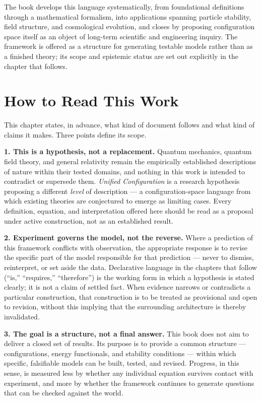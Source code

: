 \documentclass[11pt,oneside]{book}
\begin{document}
The book develops this language systematically, from foundational
definitions through a mathematical formalism, into applications spanning
particle stability, field structure, and cosmological evolution, and closes
by proposing configuration space itself as an object of long-term
scientific and engineering inquiry. The framework is offered as a
structure for generating testable models rather than as a finished theory;
its scope and epistemic status are set out explicitly in the chapter that
follows.

\chapter*{How to Read This Work}

This chapter states, in advance, what kind of document follows and what
kind of claims it makes. Three points define its scope.

\bigskip
\noindent\textbf{1. This is a hypothesis, not a replacement.}
Quantum mechanics, quantum field theory, and general relativity remain the
empirically established descriptions of nature within their tested domains,
and nothing in this work is intended to contradict or supersede them.
\emph{Unified Configuration} is a research hypothesis proposing a different
\emph{level} of description --- a configuration-space language from which
existing theories are conjectured to emerge as limiting cases. Every
definition, equation, and interpretation offered here should be read as a
proposal under active construction, not as an established result.

\bigskip
\noindent\textbf{2. Experiment governs the model, not the reverse.}
Where a prediction of this framework conflicts with observation, the
appropriate response is to revise the specific part of the model
responsible for that prediction --- never to dismiss, reinterpret, or set
aside the data. Declarative language in the chapters that follow (``is,''
``requires,'' ``therefore'') is the working form in which a hypothesis is
stated clearly; it is not a claim of settled fact. When evidence narrows or
contradicts a particular construction, that construction is to be treated
as provisional and open to revision, without this implying that the
surrounding architecture is thereby invalidated.

\bigskip
\noindent\textbf{3. The goal is a structure, not a final answer.}
This book does not aim to deliver a closed set of results. Its purpose is
to provide a common structure --- configurations, energy functionals, and
stability conditions --- within which specific, falsifiable models can be
built, tested, and revised. Progress, in this sense, is measured less by
whether any individual equation survives contact with experiment, and more
by whether the framework continues to generate questions that can be
checked against the world.
\end{document}
